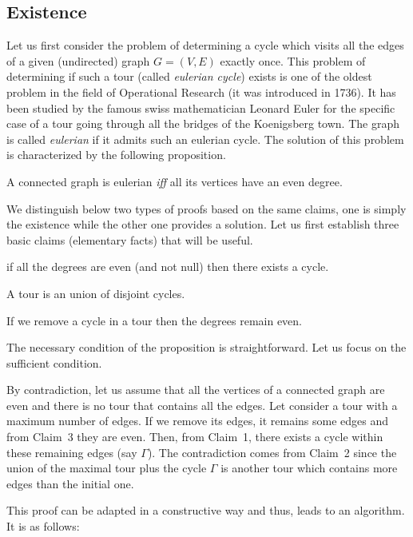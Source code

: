 \subsection{Existence}

Let us first consider the problem of determining a cycle which visits all the edges of a given (undirected) graph $G=(V,E)$ exactly once.
This problem of determining if such a tour (called \textit{eulerian cycle}) exists is one of the oldest problem in the field of Operational Research
(it was introduced in 1736). 
It has been studied by the famous swiss mathematician Leonard Euler for the specific case of a tour going through all the bridges of the Koenigsberg town. 
The graph is called \textit{eulerian} if it admits such an eulerian cycle.
The solution of this problem is characterized by the following proposition.
\bigskip

A connected graph is eulerian {\it iff} all its vertices have an even degree.
\bigskip

We distinguish below two types of proofs based on the same claims, one is simply the existence while the other one provides a solution. 
Let us first establish three basic claims (elementary facts) that will be useful.
\bigskip

if all the degrees are even (and not null) then there exists a cycle.\bigskip

A tour is an union of disjoint cycles.\bigskip

If we remove a cycle in a tour then the degrees remain even.\bigskip

The necessary condition of the proposition is straightforward. 
Let us focus on the sufficient condition.
\bigskip


By contradiction, let us assume that all the vertices of a connected graph are even and there is no tour that contains all the edges.
Let consider a tour with a maximum number of edges. 
If we remove its edges, it remains some edges and from Claim~3 they are even.
Then, from Claim~1, there exists a cycle within these remaining edges (say $\Gamma$). 
The contradiction comes from Claim~2 since the union of the maximal tour plus the cycle $\Gamma$ 
is another tour which contains more edges than the initial one.
\bigskip

\noindent This proof can be adapted in a constructive way and thus, leads to an algorithm. It is as follows:

